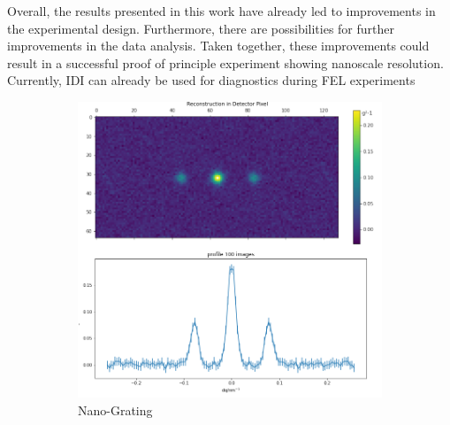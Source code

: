 \vspace{0.5cm}
Overall, the results presented in this work have already led to improvements in the experimental design. Furthermore, there are possibilities for further improvements in the data analysis. Taken together, these improvements could result in a successful proof of principle experiment showing nanoscale resolution. Currently, IDI can already be used for diagnostics during FEL experiments
\clearpage
\vspace*{-1.5cm}
\begin{figure}[H]
	\centering
	\begin{subfigure}[b]{0.50\textwidth}
		\includegraphics[width=\linewidth]{images/lv65simA.pdf}
		\caption{Nano-Grating}
		\label{fig:outlook_grating}
	\end{subfigure}
	\begin{subfigure}[b]{0.37\textwidth}

\end{subfigure}
\end{figure}
